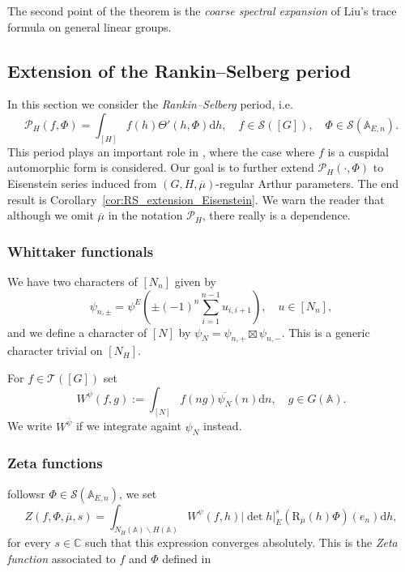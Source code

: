\documentclass[letterpaper,11pt]{amsart}
\newcommand{\bA}{\mathbb{A}}
\newcommand{\C}{\mathbb{C}}
\newcommand{\cP}{\mathcal{P}}
\newcommand{\cS}{\mathcal{S}}
\newcommand{\rd}{\mathrm{d}}
\newcommand{\<}{\negthickspace}
\newcommand{\valP}[1]{\left|#1\right|}
\theoremstyle{definition}
\theoremstyle{plain}
\theoremstyle{remark}
\numberwithin{equation}{section}
\begin{document}
    The second point of the theorem is the \emph{coarse spectral expansion} of Liu's trace formula on general linear groups.


\subsection{Extension of the Rankin--Selberg period}

In this section we consider the \emph{Rankin--Selberg} period, i.e.
\begin{equation}
    \label{eq:RS_period}
    \cP_{H}(f,\Phi)=\int_{[H]} f(h )\Theta'(h,\Phi)\rd h, \quad f \in \cS([G]), \quad \Phi \in \cS(\bA_{E,n}).
\end{equation}
This period plays an important role in \cite{JPSS83}, where the case where $f$ is a cuspidal automorphic form is considered. Our goal is to further extend $\cP_H(\cdot,\Phi)$ to Eisenstein series induced from $(G,H,\overline{\mu})$-regular Arthur parameters. The end result is Corollary~\ref{cor:RS_extension_Eisenstein}. We warn the reader that although we omit $\overline{\mu}$ in the notation $\cP_H$, there really is a dependence.

\subsubsection{Whittaker functionals}
\label{subsubsec:whittaker}

 We have two characters of $[N_{n}]$ given by
    \begin{equation}    \label{eq:psiN}
    \psi_{n,\pm}= \psi^E
    \left( \pm (-1)^n \sum_{i=1}^{n-1} u_{i,i+1} \right), \quad u \in [N_{n}],
    \end{equation}
and we define a character of $[N]$ by $\psi_N = \psi_{n,+} \boxtimes
\psi_{n,-}$. This is a generic character trivial on $[N_{H}]$. 

    For $f \in \mathcal{T}([G])$ set
    \begin{equation}    \label{eq:Whittaker}
    W^\psi(f,g):= \int_{[N]} f(ng) \overline{\psi_N}(n) \rd n, \quad g \in G(\bA).
    \end{equation}
    We write $W^{\overline{\psi}}$ if we integrate againt $\psi_N$ instead. 
    
    \subsubsection{Zeta functions}
    followsr $\Phi \in \cS(\bA_{E,n})$, we set
    \begin{equation}    \label{eq:Z_phi}
    Z(f,\Phi,\overline{\mu}, s)=
    \int_{N_{H}(\bA) \backslash H(\bA)} W^\psi(f,h)
    \valP{\det h}_E^{s} (\mathrm{R}_{\overline{\mu}}(h)\Phi)(e_n) \rd h,
    \end{equation}
    for every $s \in \C$ such that this expression converges absolutely. This is the \emph{Zeta function} associated to $f$ and $\Phi$ defined in \cite{JPSS83}
\end{document}
